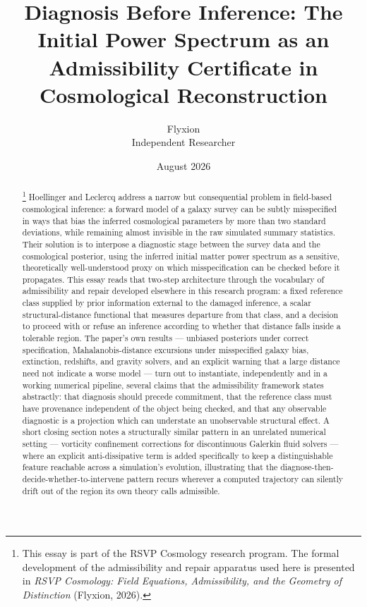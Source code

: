 \documentclass[11pt]{article}
\title{Diagnosis Before Inference: The Initial Power Spectrum as an Admissibility Certificate in Cosmological Reconstruction}
\author{Flyxion \\ \small Independent Researcher}
\date{August 2026}
\begin{document}
\maketitle

\begin{abstract}\footnote{This essay is part of the RSVP Cosmology research program. The formal development of the admissibility and repair apparatus used here is presented in \emph{RSVP Cosmology: Field Equations, Admissibility, and the Geometry of Distinction} (Flyxion, 2026).}
Hoellinger and Leclercq \cite{hoellinger2024diagnosing} address a narrow but consequential problem in field-based cosmological inference: a forward model of a galaxy survey can be subtly misspecified in ways that bias the inferred cosmological parameters by more than two standard deviations, while remaining almost invisible in the raw simulated summary statistics. Their solution is to interpose a diagnostic stage between the survey data and the cosmological posterior, using the inferred initial matter power spectrum as a sensitive, theoretically well-understood proxy on which misspecification can be checked before it propagates. This essay reads that two-step architecture through the vocabulary of admissibility and repair developed elsewhere in this research program: a fixed reference class supplied by prior information external to the damaged inference, a scalar structural-distance functional that measures departure from that class, and a decision to proceed with or refuse an inference according to whether that distance falls inside a tolerable region. The paper's own results --- unbiased posteriors under correct specification, Mahalanobis-distance excursions under misspecified galaxy bias, extinction, redshifts, and gravity solvers, and an explicit warning that a large distance need not indicate a worse model --- turn out to instantiate, independently and in a working numerical pipeline, several claims that the admissibility framework states abstractly: that diagnosis should precede commitment, that the reference class must have provenance independent of the object being checked, and that any observable diagnostic is a projection which can understate an unobservable structural effect. A short closing section notes a structurally similar pattern in an unrelated numerical setting --- vorticity confinement corrections for discontinuous Galerkin fluid solvers --- where an explicit anti-dissipative term is added specifically to keep a distinguishable feature reachable across a simulation's evolution, illustrating that the diagnose-then-decide-whether-to-intervene pattern recurs wherever a computed trajectory can silently drift out of the region its own theory calls admissible.
\end{abstract}
\end{document}
